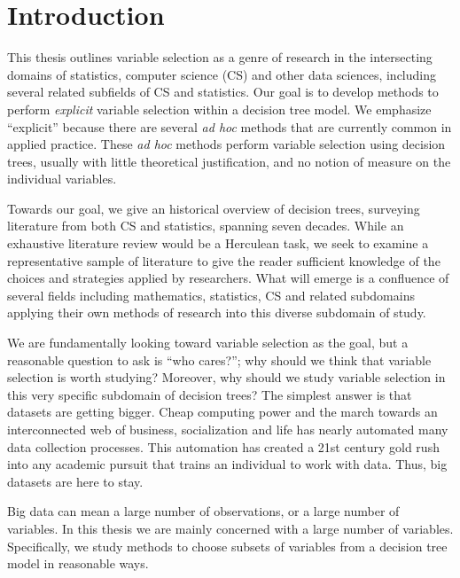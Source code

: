 \chapter{Introduction}
\label{ch:intro}

This thesis outlines variable selection as a genre of research in the intersecting domains of statistics, computer science (CS) and other data sciences, including several related subfields of CS  and statistics. Our goal is to develop methods to perform \emph{explicit} variable selection within a decision tree model. We emphasize ``explicit'' because there are several \emph{ad hoc} methods that are currently common in applied practice. These \emph{ad hoc} methods perform variable selection using decision trees, usually with little theoretical justification, and no notion of measure on the individual variables. 

Towards our goal, we give an historical overview of decision trees, surveying literature from both CS and statistics, spanning seven decades. While an exhaustive literature review would be a Herculean task, we seek to examine a representative sample of literature to give the reader sufficient knowledge of the choices and strategies applied by researchers. 
What will emerge is a confluence of several fields including mathematics, statistics, CS and related subdomains applying their own methods of research into this diverse subdomain of study.     

We are fundamentally looking toward variable selection as the goal, but a reasonable question to ask is ``who cares?''; why should we think that variable selection is worth studying? Moreover, why should we study variable selection in this very specific subdomain of decision trees? The simplest answer is that datasets are getting bigger. Cheap computing power and the march towards an interconnected web of business, socialization and life has nearly automated many data collection processes. This automation has created a 21st century gold rush into any academic pursuit that trains an individual to work with data. 
Thus, big datasets are here to stay.

 Big data can mean a large number of observations, or a large number of variables. In this thesis we are mainly concerned with a large number of variables. Specifically, we study methods to choose subsets of variables from a decision tree model in reasonable ways. 

